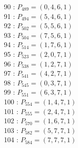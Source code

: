 \documentclass{article}
\begin{document}
{\begin{multicols}{3}
90 : $P_{489}=( 0, 4, 6, 1 )$\\
91 : $P_{494}=( 5, 4, 6, 1 )$\\
92 : $P_{502}=( 5, 5, 6, 1 )$\\
93 : $P_{504}=( 7, 5, 6, 1 )$\\
94 : $P_{514}=( 1, 7, 6, 1 )$\\
95 : $P_{523}=( 2, 0, 7, 1 )$\\
96 : $P_{538}=( 1, 2, 7, 1 )$\\
97 : $P_{541}=( 4, 2, 7, 1 )$\\
98 : $P_{545}=( 0, 3, 7, 1 )$\\
99 : $P_{551}=( 6, 3, 7, 1 )$\\
100 : $P_{554}=( 1, 4, 7, 1 )$\\
101 : $P_{555}=( 2, 4, 7, 1 )$\\
102 : $P_{570}=( 1, 6, 7, 1 )$\\
103 : $P_{582}=( 5, 7, 7, 1 )$\\
104 : $P_{584}=( 7, 7, 7, 1 )$\\
\end{multicols}


%


%


}%
\end{document}
